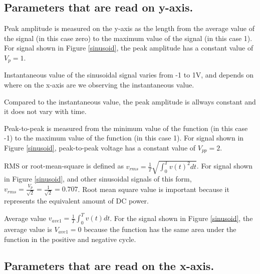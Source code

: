 \documentclass{ximera}
\begin{document}
\subsection{Parameters that are read on y-axis.}

\begin{definition}
Peak amplitude is measured on the y-axis as the length from the average value of the signal (in this case zero) to the maximum value of the signal (in this case 1). For signal shown in Figure \ref{sinusoid}, the peak  amplitude has a constant value of $V_p=1$. 
\end{definition}


\begin{definition}
Instantaneous value of the sinusoidal signal varies from -1 to 1V, and depends on where on the x-axis are we observing the instantaneous value. 

Compared to the instantaneous value, the peak amplitude is allways constant and it does not vary with time. 
\end{definition}

\begin{definition}
Peak-to-peak is measured from the minimum value of the function (in this case -1) to the maximum value of the function (in this case 1).  For signal shown in Figure \ref{sinusoid}, peak-to-peak voltage has a constant value of  $V_{pp}=2$.
\end{definition}

\begin{definition}
RMS or root-mean-square is defined as $v_{rms}=\frac{1}{T} \sqrt{\int_0^T v(t)^2 dt}$. For signal shown in Figure \ref{sinusoid}, and other sinusoidal signals of this form,  $v_{rms}=\frac{V_p}{\sqrt{2}}=\frac{1}{\sqrt{2}}=0.707$. Root mean square value is important because it represents the equivalent amount of DC power.
\end{definition}


\begin{definition}
Average value $v_{ave1}=\frac{1}{T} \int_0^T v(t) dt$. For the signal shown in Figure \ref{sinusoid}, the average value is $V_{ave1}=0$ because the function has the same area under the function in the positive and negative cycle. 
\end{definition}

\subsection{Parameters that are read on the x-axis.}
\end{document}
